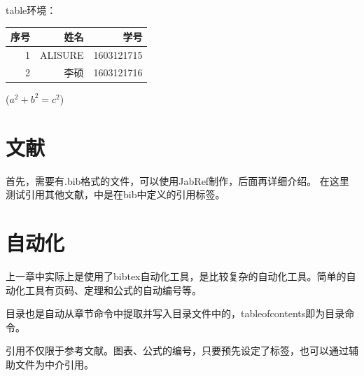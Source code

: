 \documentclass[UTF8]{ctexart}  %
\begin{document}
		table环境：
		\begin{table}[H]  %
			\centering  %
			\begin{tabular}{|rrr|}
				\hline
					序号 & 姓名 & 学号 \\
				\hline
					1 & ALISURE & 1603121715 \\ 2 & 李硕 & 1603121716 \\
				\hline
			\end{tabular}
			\qquad  %
				($a^2 + b^2 = c^2$)
		\end{table}
		
	\section{文献}
		首先，需要有.bib格式的文件，可以使用JabRef制作，后面再详细介绍。
		在这里测试引用其他文献\cite{Kline}，{}中是在bib中定义的引用标签。
	
	\section{自动化}
		上一章中实际上是使用了bibtex自动化工具，是比较复杂的自动化工具。简单的自动化工具有页码、定理和公式的自动编号等。
		
		目录也是自动从章节命令中提取并写入目录文件中的，tableofcontents即为目录命令。
		
		引用不仅限于参考文献。图表、公式的编号，只要预先设定了标签，也可以通过辅助文件为中介引用。
	
	\nocite{Shiye}  %
\end{document}
